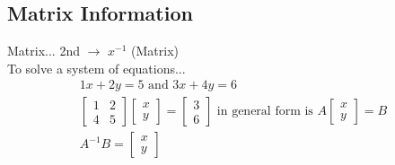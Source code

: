 \documentclass[]{article}
\newcommand*\ra{$\rightarrow$ }
\begin{document}
	\subsection*{Matrix Information}
	Matrix...  2nd \ra $x^{-1}$ (Matrix) \\
	To solve a system of equations...
	\begin{align*}
		1x + 2y = 5 \text{ and } 3x + 4y = 6 \\
		\begin{bmatrix}
			1 & 2 \\
			4 & 5
		\end{bmatrix}
		\begin{bmatrix}
			x \\
			y
		\end{bmatrix}
		=
		\begin{bmatrix}
			3 \\
			6
		\end{bmatrix} \text{ in general form is }
		A
		\begin{bmatrix}
			x \\
			y
		\end{bmatrix}
		=
		B \\
		A^{-1} B =
		\begin{bmatrix}
			x \\
			y
		\end{bmatrix}
	\end{align*}
\end{document}
